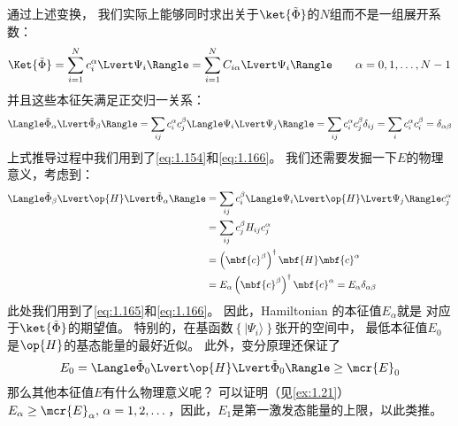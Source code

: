 通过上述变换，
我们实际上能够同时求出关于$\ket{\tilde\Phi}$的$N$组而不是一组展开系数：
\begin{equation}
 \Ket{\tilde\Phi} = \sum_{i=1}^N c_i^\alpha \Lvert\Psi_i\Rangle = \sum_{i=1}^N C_{i\alpha}\Lvert\Psi_i\Rangle \qquad \alpha = 0, 1, \dots, N-1
 \label{eq:1.168}
\end{equation}
并且这些本征矢满足正交归一关系：
\begin{equation}
 \Langle\tilde\Phi_\alpha\Lvert\tilde\Phi_\beta\Rangle = \sum_{ij} c_i^\alpha c_j^\beta \Langle\Psi_i\Lvert\Psi_j\Rangle = \sum_{ij}c_i^\alpha c_j^\beta\delta_{ij} = \sum_i c_i^\alpha c_i^\beta = \delta_{\alpha\beta}
 \label{eq:1.169}
\end{equation}
上式推导过程中我们用到了\autoref{eq:1.154}和\autoref{eq:1.166}。
我们还需要发掘一下$E$的物理意义，考虑到：
\begin{equation}
 \begin{split}
     \Langle\tilde\Phi_\beta\Lvert\op{H}\Lvert\tilde\Phi_\alpha\Rangle &= \sum_{ij} c_i^\beta \Langle \Psi_i\Lvert\op{H}\Lvert\Psi_j\Rangle c_j^\alpha \\
     &= \sum_{ij}c_j^\beta H_{ij}c_j^\alpha \\
     &= \left(\mbf{c}^\beta\right)^\dagger\mbf{H}\mbf{c}^\alpha \\
     &= E_\alpha \left(\mbf{c}^\beta\right)^\dagger\mbf{c}^\alpha = E_\alpha \delta_{\alpha\beta}
 \end{split}
 \label{eq:1.170}
\end{equation}
此处我们用到了\autoref{eq:1.165}和\autoref{eq:1.166}。
因此，Hamiltonian 的本征值$E_\alpha$就是 对应于$\ket{\tilde\Phi}$的期望值。
特别的，在基函数$\left\{\vert\Psi_i\rangle\right\}$张开的空间中，
最低本征值$E_0$是$\op{H}$的基态能量的最好近似。
此外，变分原理还保证了
\begin{equation}
 E_0 = \Langle\tilde\Phi_0\Lvert\op{H}\Lvert\tilde\Phi_0\Rangle \geq \mcr{E}_0
 \label{eq:1.171}
\end{equation}
那么其他本征值$E$有什么物理意义呢？
可以证明（见\autoref{ex:1.21}）
$E_\alpha \geq \mcr{E}_\alpha,\, \alpha = 1, 2, \dots$，因此，$E_1$是第一激发态能量的上限，以此类推。

